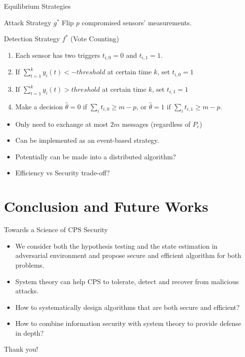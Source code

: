 \documentclass[10pt]{beamer}
\begin{document}
\begin{frame}{Equilibrium Strategies}
  \begin{block}{Attack Strategy $g^*$}
    Flip $p$ compromised sensors' measurements.
  \end{block}
  \begin{block}{Detection Strategy $f^*$ (Vote Counting)}
    \begin{enumerate}
      \item Each sensor has two triggers $t_{i,0}=0$ and $t_{i,1}=1$.
      \item If $\sum_{t=1}^k y_i(t) < -threshold$ at certain time $k$, set $t_{i,0} = 1$
      \item If $\sum_{t=1}^k y_i(t) > threshold$ at certain time $k$, set $t_{i,1} = 1$
      \item Make a decision $\hat \theta = 0$ if $\sum_i t_{i,0} \geq m-p$, or $\hat \theta = 1$ if $\sum_i t_{i,1} \geq m-p$.
    \end{enumerate}
  \end{block}

  \begin{itemize}
      \item Only need to exchange at most $2m$ messages (regardless of $P_e$)
      \item Can be implemented as an event-based strategy.
      \item Potentially can be made into a distributed algorithm?
      \item Efficiency vs Security trade-off?
  \end{itemize}
\end{frame}

\section{Conclusion and Future Works}

\begin{frame}{Towards a Science of CPS Security}
  \begin{itemize}
    \item We consider both the hypothesis testing and the state estimation in adversarial environment and propose secure and efficient algorithm for both problems.
    \item System theory can help CPS to tolerate, detect and recover from malicious attacks.
    \item How to systematically design algorithms that are both secure and efficient?
    \item How to combine information security with system theory to provide defense in depth?
  \end{itemize}
\end{frame}

\begin{frame}[standout]
  Thank you!
\end{frame}
\end{document}
